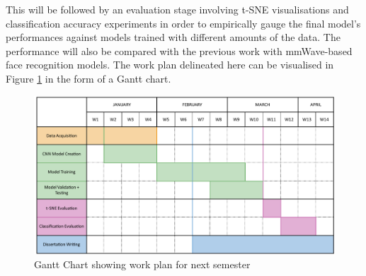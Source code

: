 \documentclass{interim}
\begin{document}
This will be followed by an evaluation stage involving t-SNE visualisations and classification accuracy experiments in order to empirically gauge the final model's performances against models trained with different amounts of the data. The performance will also be compared with the previous work with mmWave-based face recognition models. The work plan delineated here can be visualised in Figure \ref{fig:gantt_chart} in the form of a Gantt chart.

\begin{figure}[h!]
    \centering
    \includegraphics[width=1\textwidth]{images/gantt_chart.pdf}
    \caption{Gantt Chart showing work plan for next semester}
    \label{fig:gantt_chart}
\end{figure}




\end{document}
